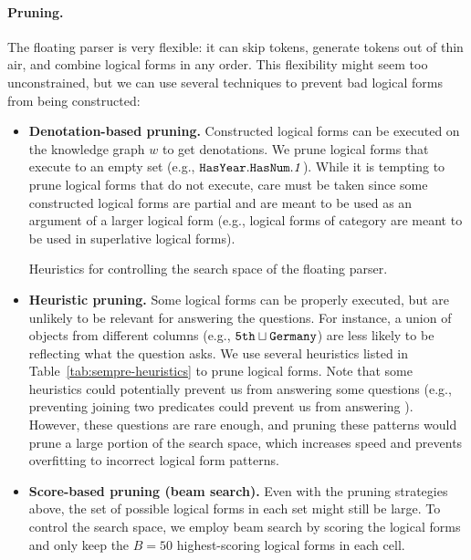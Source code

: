 \paragraph{Pruning.}

The floating parser is very flexible:
it can skip tokens,
generate tokens out of thin air,
and combine logical forms in any order.
This flexibility might seem too unconstrained,
but we can use several techniques to prevent
bad logical forms from being constructed:

\begin{itemize}
\item \textbf{Denotation-based pruning.}
Constructed logical forms can be executed
on the knowledge graph $w$ to get denotations.
We prune logical forms that execute to an empty set
(e.g., $\texttt{Has}{\texttt{Year}}.\texttt{Has}{\texttt{Num}}.\text{\emph{1}}$).
While it is tempting to prune logical forms that do not execute,
care must be taken since some constructed logical forms
are partial and are meant to be used as an argument
of a larger logical form
(e.g., logical forms of category 
are meant to be used in superlative logical forms).

\begin{table} \centering

\caption{Heuristics for controlling the search space of the floating parser.}
\label{tab:sempre-heuristics}
\end{table}

\item \textbf{Heuristic pruning.}
Some logical forms can be properly executed,
but are unlikely to be relevant for answering the questions.
For instance, a union of objects from different columns
(e.g., $\texttt{5th} \sqcup \texttt{Germany}$)
are less likely to be reflecting what the question asks.
We use several heuristics listed in Table~\ref{tab:sempre-heuristics}
to prune logical forms.
Note that some heuristics could potentially prevent us
from answering some questions
(e.g., preventing joining two  predicates
could prevent us from answering
).
However, these questions are rare enough,
and pruning these patterns would prune a large portion of the
search space, which increases speed and prevents overfitting
to incorrect logical form patterns.

\item \textbf{Score-based pruning (beam search).}
Even with the pruning strategies above,
the set of possible logical forms in each set
might still be large.
To control the search space,
we employ beam search by scoring the logical forms
and only keep the $B = 50$
highest-scoring logical forms in each cell.

\end{itemize}

